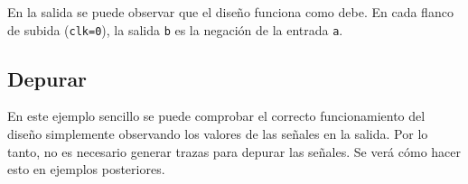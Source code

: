 

En la salida se puede observar que el diseño funciona como debe. En cada flanco de subida (\verb|clk=0|), la salida \verb|b| es la negación de la entrada \verb|a|.

\subsection{Depurar}
En este ejemplo sencillo se puede comprobar el correcto funcionamiento del diseño simplemente observando los valores de las señales en la salida. Por lo tanto, no es necesario generar trazas para depurar las señales. Se verá cómo hacer esto en ejemplos posteriores.

